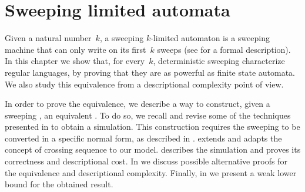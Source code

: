 \chapter{Sweeping limited automata}\label{ch:sweeping}
Given a natural number~$k$, a sweeping $k$-limited automaton is a sweeping machine that can only write on its first~$k$ sweeps (see  for a formal description).
In this chapter we show that, for every~$k$, deterministic sweeping \kLAs characterize regular languages, by proving that they are as powerful as finite state automata. We also study this equivalence from a descriptional complexity point of view.

In order to prove the equivalence, we describe a way to construct, given a sweeping \kDLA, an equivalent \ONFA.
To do so, we recall and revise some of the techniques presented in  to obtain a simulation.
This construction requires the sweeping \kDLA to be converted in a specific normal form, as described in .
 extends and adapts the concept of crossing sequence to our model.
 describes the simulation and proves its correctness and descriptional cost.
In  we discuss possible alternative proofs for the equivalence and descriptional complexity.
Finally, in  we present a weak lower bound for the obtained result.



